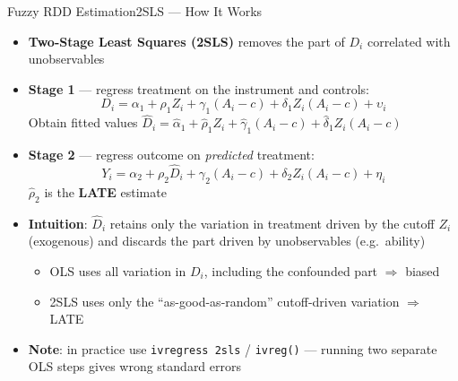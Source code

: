 \documentclass[hyperref={pdfpagelabels=false}]{beamer}
\begin{document}
\begin{frame}{Fuzzy RDD Estimation}{2SLS --- How It Works}
	\begin{itemize}
		\item \textbf{Two-Stage Least Squares (2SLS)} removes the part of $D_i$ correlated with unobservables
		\vspace{0.15cm}
		\item \textbf{Stage 1} --- regress treatment on the instrument and controls:
		\begin{equation*}
			D_i = \alpha_1 + \rho_1 Z_i + \gamma_1(A_i-c) + \delta_1 Z_i(A_i-c) + \upsilon_i
		\end{equation*}
		Obtain fitted values $\hat{D}_i = \hat{\alpha}_1 + \hat{\rho}_1 Z_i + \hat{\gamma}_1(A_i-c) + \hat{\delta}_1 Z_i(A_i-c)$
		\vspace{0.15cm}
		\item \textbf{Stage 2} --- regress outcome on \emph{predicted} treatment:
		\begin{equation*}
			Y_i = \alpha_2 + \rho_2 \hat{D}_i + \gamma_2(A_i-c) + \delta_2 Z_i(A_i-c) + \eta_i
		\end{equation*}
		$\hat{\rho}_2$ is the \textbf{LATE} estimate
		\vspace{0.15cm}
		\item \textbf{Intuition}: $\hat{D}_i$ retains only the variation in treatment driven by the cutoff $Z_i$ (exogenous) and discards the part driven by unobservables (e.g.\ ability)
		\vspace{0.1cm}
		\begin{itemize}
			\item OLS uses all variation in $D_i$, including the confounded part $\Rightarrow$ biased
			\item 2SLS uses only the ``as-good-as-random'' cutoff-driven variation $\Rightarrow$ LATE
		\end{itemize}
		\vspace{0.1cm}
		\item \textbf{Note}: in practice use \texttt{ivregress 2sls} / \texttt{ivreg()} --- running two separate OLS steps gives wrong standard errors
	\end{itemize}
\end{frame}
\end{document}
